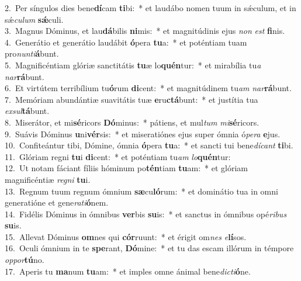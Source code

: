 {2.~}Per síngulos dies bene\textbf{dí}cam \textbf{ti}bi:~* et laudábo nomen tuum in sǽculum, et in sǽ\textit{cu}\textit{lum} \textbf{sǽ}culi.\\
{3.~}Magnus Dóminus, et lau\textbf{dá}bilis \textbf{ni}mis:~* et magnitúdinis ejus \textit{non} \textit{est} \textbf{fi}nis.\\
{4.~}Generátio et generátio laudábit \textbf{ó}pera \textbf{tu}a:~* et poténtiam tuam pro\textit{nun}\textit{ti}\textbf{á}bunt.\\
{5.~}Magnificéntiam glóriæ sanctitátis \textbf{tu}æ lo\textbf{quén}tur:~* et mirabília tu\textit{a} \textit{nar}\textbf{rá}bunt.\\
{6.~}Et virtútem terribílium tu\textbf{ó}rum \textbf{di}cent:~* et magnitúdinem tu\textit{am} \textit{nar}\textbf{rá}bunt.\\
{7.~}Memóriam abundántiæ suavitátis tuæ \textbf{e}ru\textbf{ctá}bunt:~* et justítia tua \textit{ex}\textit{sul}\textbf{tá}bunt.\\
{8.~}Miserátor, et mi\textbf{sé}ricors \textbf{Dó}minus:~* pátiens, et mul\textit{tum} \textit{mi}\textbf{sé}ricors.\\
{9.~}Suávis Dóminus \textbf{u}ni\textbf{vér}sis:~* et miseratiónes ejus super ómnia ó\textit{pe}\textit{ra} \textbf{e}jus.\\
{10.~}Confiteántur tibi, Dómine, ómnia \textbf{ó}pera \textbf{tu}a:~* et sancti tui bene\textit{dí}\textit{cant} \textbf{ti}bi.\\
{11.~}Glóriam regni \textbf{tu}i \textbf{di}cent:~* et poténtiam tu\textit{am} \textit{lo}\textbf{quén}tur:\\
{12.~}Ut notam fáciant fíliis hóminum po\textbf{tén}tiam \textbf{tu}am:~* et glóriam magnificéntiæ \textit{re}\textit{gni} \textbf{tu}i.\\
{13.~}Regnum tuum regnum ómnium \textbf{sæ}cu\textbf{ló}rum:~* et dominátio tua in omni generatióne et gene\textit{ra}\textit{ti}\textbf{ó}nem.\\
{14.~}Fidélis Dóminus in ómnibus \textbf{ver}bis \textbf{su}is:~* et sanctus in ómnibus opé\textit{ri}\textit{bus} \textbf{su}is.\\
{15.~}Allevat Dóminus \textbf{om}nes qui \textbf{cór}ruunt:~* et érigit om\textit{nes} \textit{e}\textbf{lí}sos.\\
{16.~}Oculi ómnium in te \textbf{spe}rant, \textbf{Dó}mine:~* et tu das escam illórum in témpore \textit{op}\textit{por}\textbf{tú}no.\\
{17.~}Aperis tu \textbf{ma}num \textbf{tu}am:~* et imples omne ánimal bene\textit{di}\textit{cti}\textbf{ó}ne.\\
